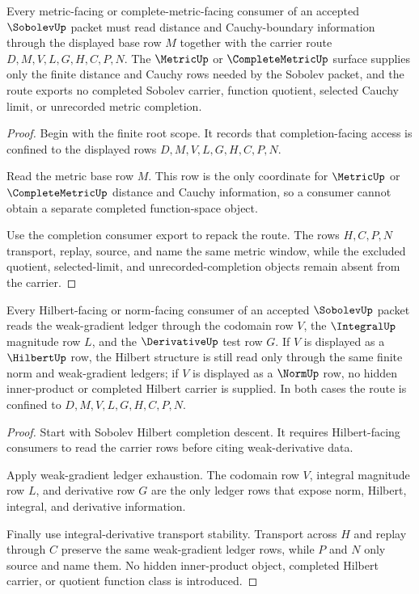 \begin{theorem}
\label{thm:sobolev-metric-completion-root-window}
Every metric-facing or complete-metric-facing consumer of an accepted $\SobolevUp$ packet must read distance and Cauchy-boundary information through the displayed base row $M$ together with the carrier route $D,M,V,L,G,H,C,P,N$. The $\MetricUp$ or $\CompleteMetricUp$ surface supplies only the finite distance and Cauchy rows needed by the Sobolev packet, and the route exports no completed Sobolev carrier, function quotient, selected Cauchy limit, or unrecorded metric completion.
\end{theorem}
\begin{proof}
Begin with the finite root scope. It records that completion-facing access is confined to the displayed rows $D,M,V,L,G,H,C,P,N$.

Read the metric base row $M$. This row is the only coordinate for $\MetricUp$ or $\CompleteMetricUp$ distance and Cauchy information, so a consumer cannot obtain a separate completed function-space object.

Use the completion consumer export to repack the route. The rows $H,C,P,N$ transport, replay, source, and name the same metric window, while the excluded quotient, selected-limit, and unrecorded-completion objects remain absent from the carrier.
\end{proof}

\begin{theorem}
\label{thm:sobolev-hilbert-norm-root-window}
Every Hilbert-facing or norm-facing consumer of an accepted $\SobolevUp$ packet reads the weak-gradient ledger through the codomain row $V$, the $\IntegralUp$ magnitude row $L$, and the $\DerivativeUp$ test row $G$. If $V$ is displayed as a $\HilbertUp$ row, the Hilbert structure is still read only through the same finite norm and weak-gradient ledgers; if $V$ is displayed as a $\NormUp$ row, no hidden inner-product or completed Hilbert carrier is supplied. In both cases the route is confined to $D,M,V,L,G,H,C,P,N$.
\end{theorem}
\begin{proof}
Start with Sobolev Hilbert completion descent. It requires Hilbert-facing consumers to read the carrier rows before citing weak-derivative data.

Apply weak-gradient ledger exhaustion. The codomain row $V$, integral magnitude row $L$, and derivative row $G$ are the only ledger rows that expose norm, Hilbert, integral, and derivative information.

Finally use integral-derivative transport stability. Transport across $H$ and replay through $C$ preserve the same weak-gradient ledger rows, while $P$ and $N$ only source and name them. No hidden inner-product object, completed Hilbert carrier, or quotient function class is introduced.
\end{proof}

